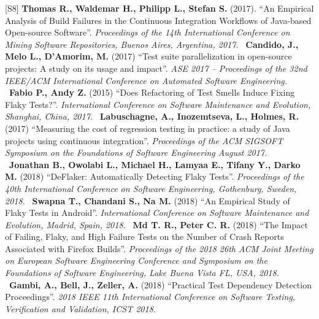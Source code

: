 [S8] \textbf{Thomas R., Waldemar H., Philipp L., Stefan S.} (2017). “An Empirical Analysis of Build Failures in the Continuous Integration Workflows of Java-based Open-source Software”. \emph{Proceedings of the 14th International Conference on Mining Software Repositories, Buenos Aires, Argentina, 2017.}
\newline~\newline
[S9] \textbf{Candido, J., Melo L., D’Amorim, M.} (2017) “Test suite parallelization in open-source projects: A study on its usage and impact”. \emph{ASE 2017 – Proceedings of the 32nd IEEE/ACM International Conference on Automated Software
Engineering.}
\newline~\newline
[S10] \textbf{Fabio P., Andy Z.} (2015) “Does Refactoring of Test Smells Induce Fixing Flaky Tests?”. \emph{International Conference on Software Maintenance and Evolution, Shanghai, China, 2017.}
\newline~\newline
[S11] \textbf{Labuschagne, A., Inozemtseva, L., Holmes, R.} (2017) “Measuring the cost of regression testing in practice: a study of Java projects using continuous integration”. \emph{Proceedings of the ACM SIGSOFT Symposium on the Foundations of Software Engineering August 2017.}
\newline~\newline
[S12] \textbf{Jonathan B., Owolabi L., Michael H., Lamyaa E., Tifany Y., Darko M.} (2018) “DeFlaker: Automatically Detecting Flaky Tests”. \emph{Proceedings of the 40th International Conference on Software Engineering, Gothenburg, Sweden, 2018.}
\newline~\newline
[S13] \textbf{Swapna T., Chandani S., Na M.} (2018) “An Empirical Study of Flaky Tests in Android”. \emph{International Conference on Software Maintenance and Evolution, Madrid, Spain, 2018.}
\newline~\newline
[S14] \textbf{Md T. R., Peter C. R.} (2018) “The Impact of Failing, Flaky, and High Failure Tests on the Number of Crash Reports Associated with Firefox Builds”. \emph{Proceedings of the 2018 26th ACM Joint Meeting on European Software Engineering Conference and Symposium on the Foundations of Software Engineering, Lake Buena Vista FL, USA, 2018.}
\newline~\newline
[S15] \textbf{Gambi, A., Bell, J., Zeller, A.} (2018) “Practical Test Dependency Detection Proceedings”. \emph{2018 IEEE 11th International Conference on Software Testing, Verification and Validation, ICST 2018.}
